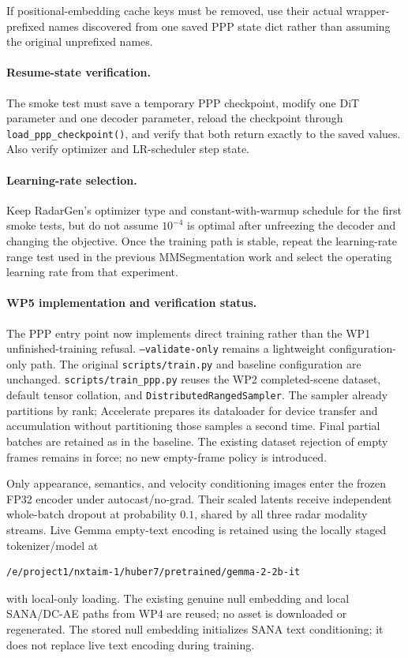 \documentclass[11pt,a4paper]{article}
\begin{document}
If positional-embedding cache keys must be removed, use their actual wrapper-prefixed names discovered from one saved PPP state dict rather than assuming the original unprefixed names.

\paragraph{Resume-state verification.}
The smoke test must save a temporary PPP checkpoint, modify one DiT parameter and one decoder parameter, reload the checkpoint through \texttt{load\_ppp\_checkpoint()}, and verify that both return exactly to the saved values. Also verify optimizer and LR-scheduler step state.

\paragraph{Learning-rate selection.}
Keep RadarGen's optimizer type and constant-with-warmup schedule for the first smoke tests, but do not assume \(10^{-4}\) is optimal after unfreezing the decoder and changing the objective. Once the training path is stable, repeat the learning-rate range test used in the previous MMSegmentation work and select the operating learning rate from that experiment.

\paragraph{WP5 implementation and verification status.}
The PPP entry point now implements direct training rather than the WP1
unfinished-training refusal. \texttt{--validate-only} remains a lightweight
configuration-only path. The original \texttt{scripts/train.py} and baseline
configuration are unchanged. \texttt{scripts/train\_ppp.py} reuses the WP2
completed-scene dataset, default tensor collation, and
\texttt{DistributedRangedSampler}. The sampler already partitions by rank;
Accelerate prepares its dataloader for device transfer and accumulation
without partitioning those samples a second time. Final partial batches
are retained as in the baseline. The existing dataset rejection of empty
frames remains in force; no new empty-frame policy is introduced.

Only appearance, semantics, and velocity conditioning images enter the
frozen FP32 encoder under autocast/no-grad. Their scaled latents receive
independent whole-batch dropout at probability \(0.1\), shared by all
three radar modality streams. Live Gemma empty-text encoding is retained
using the locally staged tokenizer/model at
\begin{lstlisting}
/e/project1/nxtaim-1/huber7/pretrained/gemma-2-2b-it
\end{lstlisting}
with local-only loading. The existing genuine null embedding and local
SANA/DC-AE paths from WP4 are reused; no asset is downloaded or regenerated.
The stored null embedding initializes SANA text conditioning; it does not
replace live text encoding during training.
\end{document}
